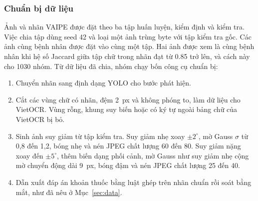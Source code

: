 \subsubsection{Chuẩn bị dữ liệu}
Ảnh và nhãn VAIPE được đặt theo ba tập huấn luyện, kiểm định và kiểm tra.
Việc chia tập dùng seed 42 và loại một ảnh trùng byte với tập kiểm tra gốc.
Các ảnh cùng bệnh nhân được đặt vào cùng một tập.
Hai ảnh được xem là cùng bệnh nhân khi hệ số Jaccard giữa tập chữ trong nhãn đạt từ \num{0.85} trở lên, và cách này cho \num{1030} nhóm.
Từ dữ liệu đã chia, nhóm chạy bốn công cụ chuẩn bị:
\begin{enumerate}[leftmargin=2em, itemsep=0.1em, topsep=0.2em]
  \item Chuyển nhãn sang định dạng YOLO cho bước phát hiện.
  \item Cắt các vùng chữ có nhãn, đệm 2~px và không phóng to, làm dữ liệu cho VietOCR. Vùng rỗng, khung suy biến hoặc có ký tự ngoài bảng chữ của VietOCR bị bỏ.
  \item Sinh ảnh suy giảm từ tập kiểm tra. Suy giảm nhẹ xoay $\pm2^\circ$, mờ Gauss $\sigma$ từ 0,8 đến 1,2, bóng nhẹ và nén JPEG chất lượng 60 đến 80. Suy giảm nặng xoay đến $\pm5^\circ$, thêm biến dạng phối cảnh, mờ Gauss như suy giảm nhẹ cộng mờ chuyển động dài 9~px, bóng đậm và nén JPEG chất lượng 25 đến 40.
  \item Dẫn xuất đáp án khoản thuốc bằng luật ghép trên nhãn chuẩn rồi soát bằng mắt, như đã nêu ở Mục~\ref{sec:data}.
\end{enumerate}
